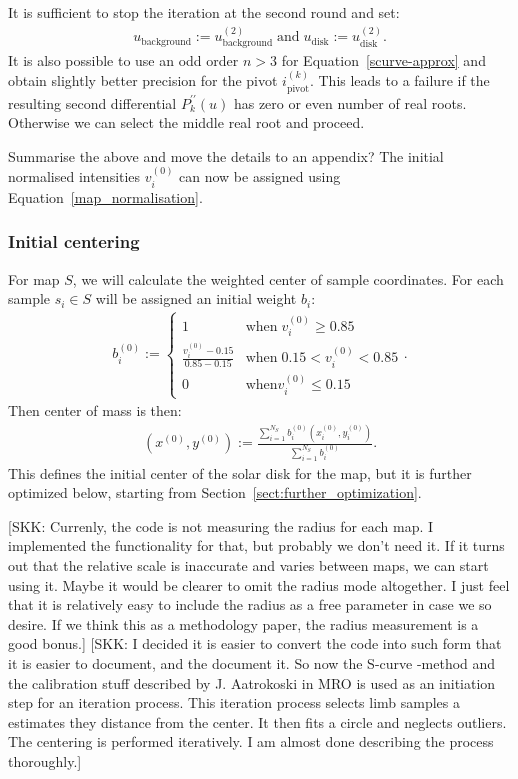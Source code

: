 \documentclass{aa}
\newcommand{\fg}[1]{\textcolor{midblue}{#1}}
\newcommand{\skk}[1]{\textcolor{midorange}{[SKK: #1]}} %
\newcommand{\eqnl}[2]{\begin{eqnarray}\label{#1}#2\end{eqnarray}}
\newcommand{\s}[2]{{#1}_{\mathrm{#2}}}
\begin{document}
  It is sufficient to stop the iteration at the second round and set:
  \eqnl{scurve-converged}{
  \s{u}{background} := \s{u}{background}^{(2)} \; \text{and} \; \s{u}{disk} := \s{u}{disk}^{(2)} \text{.}
  }
  It is also possible to use an odd order $n > 3$ for Equation~\ref{scurve-approx} and obtain slightly better precision 
  for the pivot $\s{i}{pivot}^{(k)}$. This leads to a failure if the resulting second differential $P_k^{\prime\prime}(u)$ 
  has zero or even number of real roots. Otherwise we can select the middle real root and proceed.

  \fg{Summarise the above and move the details to an appendix?}
  The initial normalised intensities $v_i^{(0)}$ can now be assigned using Equation~\ref{map_normalisation}.
  
  \subsubsection{Initial centering}\label{sect:initial_centering}

  For map $S$, we will calculate the weighted center of sample coordinates. For each sample $s_i \in S$ will be assigned an initial weight $b_i$:
  \eqnl{centering-initial-weight}{
  b_i^{(0)} := \begin{cases} 1 & \text{when}\; v_i^{(0)} \ge 0.85 \\ \frac{v_i^{(0)} - 0.15}{0.85 - 0.15} & \text{when}\; 0.15 < v_i^{(0)} < 0.85 \\ 0 & \text{when} v_i^{(0)} \le 0.15 \end{cases} \text{.}
  }
  Then center of mass is then:
  \eqnl{centering-center-of-mass}{
  \left( x^{(0)}, y^{(0)} \right) := \frac{\sum \limits_{i=1}^{N_S} b_i^{(0)} \left( x_i^{(0)}, y_i^{(0)} \right)}{\sum \limits_{i=1}^{N_S} b_i^{(0)}} \text{.}
  }
  This defines the initial center of the solar disk for the map, but it is further optimized below, starting from Section~\ref{sect:further_optimization}.

  \skk{Currenly, the code is not measuring the radius for each map. I implemented the functionality for 
  that, but probably we don't need it. If it turns out that the relative scale is inaccurate and varies between maps, we 
  can start using it. Maybe it would be clearer to omit the radius mode altogether. I just feel that it is relatively 
  easy to include the radius as a free parameter in case we so desire. If we think this as a methodology paper, the 
  radius measurement is a good bonus.}  
    \skk{I decided it is easier to convert the code into such form that it is easier to document, and the document it. 
    So now the S-curve -method and the calibration stuff described by J. Aatrokoski in MRO is used as an initiation step 
    for an iteration process. This iteration process selects limb samples a estimates they distance from the center. It 
    then fits a circle and neglects outliers. The centering is performed iteratively. I am almost done describing the 
    process thoroughly.}
\end{document}
